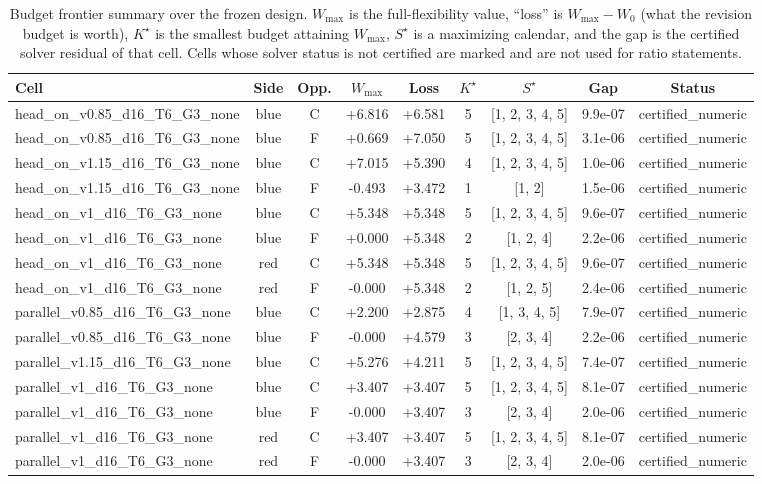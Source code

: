 \begin{table}[!htb]
\centering\small
\caption{Budget frontier summary over the frozen design.  $W_{\max}$ is the
full-flexibility value, ``loss'' is $W_{\max}-W_0$ (what the revision budget is
worth), $K^\star$ is the smallest budget attaining $W_{\max}$,
$S^\star$ is a maximizing calendar, and the gap is the certified solver
residual of that cell.  Cells whose solver status is not certified are marked
and are not used for ratio statements.}
\label{tab:results}
\begin{tabular}{lcccccccc}
\toprule
Cell & Side & Opp. & $W_{\max}$ & Loss & $K^\star$ & $S^\star$ & Gap & Status \\
\midrule
head_on_v0.85_d16_T6_G3_none & blue & C & +6.816 & +6.581 & 5 & [1, 2, 3, 4, 5] & 9.9e-07 & certified_numeric \\
head_on_v0.85_d16_T6_G3_none & blue & F & +0.669 & +7.050 & 5 & [1, 2, 3, 4, 5] & 3.1e-06 & certified_numeric \\
head_on_v1.15_d16_T6_G3_none & blue & C & +7.015 & +5.390 & 4 & [1, 2, 3, 4, 5] & 1.0e-06 & certified_numeric \\
head_on_v1.15_d16_T6_G3_none & blue & F & -0.493 & +3.472 & 1 & [1, 2] & 1.5e-06 & certified_numeric \\
head_on_v1_d16_T6_G3_none & blue & C & +5.348 & +5.348 & 5 & [1, 2, 3, 4, 5] & 9.6e-07 & certified_numeric \\
head_on_v1_d16_T6_G3_none & blue & F & +0.000 & +5.348 & 2 & [1, 2, 4] & 2.2e-06 & certified_numeric \\
head_on_v1_d16_T6_G3_none & red & C & +5.348 & +5.348 & 5 & [1, 2, 3, 4, 5] & 9.6e-07 & certified_numeric \\
head_on_v1_d16_T6_G3_none & red & F & -0.000 & +5.348 & 2 & [1, 2, 5] & 2.4e-06 & certified_numeric \\
parallel_v0.85_d16_T6_G3_none & blue & C & +2.200 & +2.875 & 4 & [1, 3, 4, 5] & 7.9e-07 & certified_numeric \\
parallel_v0.85_d16_T6_G3_none & blue & F & -0.000 & +4.579 & 3 & [2, 3, 4] & 2.2e-06 & certified_numeric \\
parallel_v1.15_d16_T6_G3_none & blue & C & +5.276 & +4.211 & 5 & [1, 2, 3, 4, 5] & 7.4e-07 & certified_numeric \\
parallel_v1_d16_T6_G3_none & blue & C & +3.407 & +3.407 & 5 & [1, 2, 3, 4, 5] & 8.1e-07 & certified_numeric \\
parallel_v1_d16_T6_G3_none & blue & F & -0.000 & +3.407 & 3 & [2, 3, 4] & 2.0e-06 & certified_numeric \\
parallel_v1_d16_T6_G3_none & red & C & +3.407 & +3.407 & 5 & [1, 2, 3, 4, 5] & 8.1e-07 & certified_numeric \\
parallel_v1_d16_T6_G3_none & red & F & -0.000 & +3.407 & 3 & [2, 3, 4] & 2.0e-06 & certified_numeric \\
\bottomrule
\end{tabular}
\end{table}
